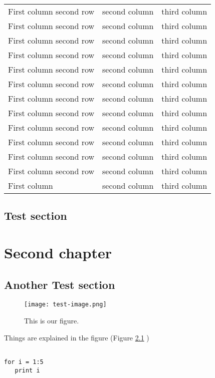 \documentclass[12pt,a4paper]{beamer}
\begin{document}
\begin{table}
\begin{longtable}{|l|c|p{4cm}|}
First column second row & second column & third column \\
First column second row & second column & third column \\
First column second row & second column & third column \\
First column second row & second column & third column \\
First column second row & second column & third column \\
First column second row & second column & third column \\
First column second row & second column & third column \\
First column second row & second column & third column \\
First column second row & second column & third column \\
First column second row & second column & third column \\
First column second row & second column & third column \\
First column second row & second column & third column \\
First column & second column & third column \\ \hline
\end{longtable}
\end{table}

\section{Test section}

\chapter{Second chapter}

\section{Another Test section}

\begin{figure}[htb!] 
\texttt{[image: test-image.png]}
\caption{This is our figure.} 
\label{ourfigure}
\end{figure}

Things are explained in the figure (Figure \ref{ourfigure} )

\begin{lstlisting}

for i = 1:5
   print i

\end{lstlisting}
\end{document}
